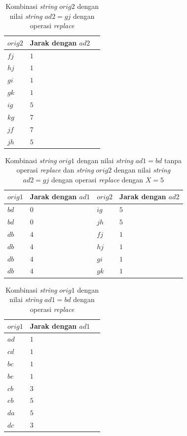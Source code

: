 \begin{table}
	\centering
	\begin{tabular}{|l|l|l|} \hline
		$ orig2 $ & Jarak dengan $ ad2 $\\ \hline
		$fj$ & $1$ \\ \hline
		$hj$ & $1$ \\ \hline
		$gi$ & $1$ \\ \hline
		$gk$ & $1$ \\ \hline
		$ig$ & $5$ \\ \hline
		$kg$ & $7$ \\ \hline
		$jf$ & $7$ \\ \hline
		$jh$ & $5$ \\ \hline
	\end{tabular}
	\caption{Kombinasi \textit{string} $orig2$ dengan nilai \textit{string} $ ad2=gj $ dengan operasi \textit{replace}}
	\label{tab:kombinasi_orig2_gj_dengan_replace}
\end{table}

\begin{table}
	\centering
	\begin{tabular}{|l|l|l|l|} \hline
		$ orig1 $ & Jarak dengan $ ad1 $ & $ orig2 $ & Jarak dengan $ ad2 $\\ \hline
		$bd$ & $0$ & $ig$ & $5$\\ \hline
		$bd$ & $0$ & $jh$ & $5$\\ \hline
		$db$ & $4$ & $fj$ & $1$\\ \hline
		$db$ & $4$ & $hj$ & $1$\\ \hline
		$db$ & $4$ & $gi$ & $1$\\ \hline
		$db$ & $4$ & $gk$ & $1$\\ \hline
	\end{tabular}
	\caption{Kombinasi \textit{string} $orig1$ dengan nilai \textit{string} $ ad1=bd $ tanpa operasi \textit{replace} dan  \textit{string} $orig2$ dengan nilai \textit{string} $ ad2=gj $ dengan operasi \textit{replace} dengan $ X=5 $}
	\label{tab:kombinasi_orig1_bd_tanpa_replace_dan_orig2_gj_dengan_replace}
\end{table}

\begin{table}
	\centering
	\begin{tabular}{|l|l|l|} \hline
		$ orig1 $ & Jarak dengan $ ad1 $\\ \hline
		$ad$ & $1$ \\ \hline
		$cd$ & $1$ \\ \hline
		$bc$ & $1$ \\ \hline
		$be$ & $1$ \\ \hline
		$cb$ & $3$ \\ \hline
		$eb$ & $5$ \\ \hline
		$da$ & $5$ \\ \hline
		$dc$ & $3$ \\ \hline
	\end{tabular}
	\caption{Kombinasi \textit{string} $orig1$ dengan nilai \textit{string} $ ad1=bd $ dengan operasi \textit{replace}}
	\label{tab:kombinasi_orig1_bd_dengan_replace}
\end{table}

